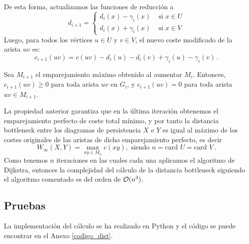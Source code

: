 De esta forma, actualizamos las funciones de reducción a
\[
d_{i+1} = \begin{cases}
d_i(x) - \gamma_i(x) & \text{ si } x \in U \\ 
d_i(x) + \gamma_i(x) & \text{ si } x \in V 
\end{cases}
\]
Luego, para todos los vértices $u \in U$ y $v \in V$, el nuevo coste modificado de la arista $uv$ es:
\[
c_{i+1}(uv)=c(uv) - d_i(u) - d_i(v) + \gamma_i(u) - \gamma_i(v)\,.
\]

\begin{property}
Sea $M_{i+1}$ el emparejamiento máximo obtenido al aumentar $M_i$. Entonces, $c_{i+1}(uv) \geq 0$ para toda arista $uv$ en $G_i$, y  $c_{i+1}(uv) = 0$ para toda arista $uv \in M_{i+1}$.
\end{property}

La propiedad anterior garantiza que en la última iteración obtenemos el emparejamiento perfecto de coste total mínimo, y por tanto la distancia bottleneck entre los diagramas de persistencia $X$ e $Y$ es igual al máximo de los costes originales de las aristas de dicho emparejamiento perfecto, es decir
\[W_\infty(X,Y)=\max_{xy \in M_n} c(xy),\text{ siendo } n= \text{card } U = \text{card } V\,.
\]
Como tenemos $n$ iteraciones en las cuales cada una aplicamos el algoritmo de Dijkstra, entonces la complejidad del cálculo de la distancia bottleneck siguiendo el algoritmo comentado es del orden de $\mathcal{O}(n^3)$.

\subsection{Pruebas}
La implementación del cálculo se ha realizado en Python y el código se puede encontrar en el Anexo \ref{codigo_dist}.




























